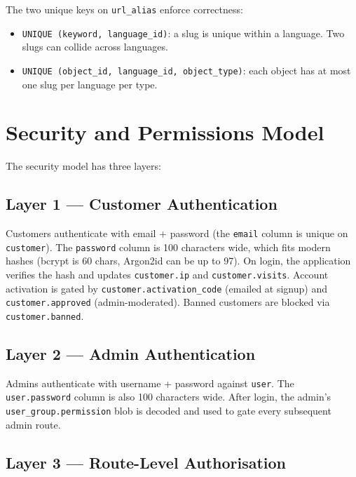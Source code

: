 \documentclass[11pt,a4paper]{article}
\begin{document}
The two unique keys on \texttt{url\_alias} enforce correctness:

\begin{itemize}[leftmargin=1.6em,itemsep=2pt]
  \item \texttt{UNIQUE (keyword, language\_id)}: a slug is unique
        within a language. Two slugs can collide across languages.
  \item \texttt{UNIQUE (object\_id, language\_id, object\_type)}:
        each object has at most one slug per language per type.
\end{itemize}

\section{Security and Permissions Model}\label{sec:security}

The security model has three layers:

\subsection{Layer 1 --- Customer Authentication}

Customers authenticate with email + password (the \texttt{email}
column is unique on \texttt{customer}). The \texttt{password}
column is 100 characters wide, which fits modern hashes
(bcrypt is 60 chars, Argon2id can be up to 97). On login, the
application verifies the hash and updates \texttt{customer.ip}
and \texttt{customer.visits}. Account activation is gated by
\texttt{customer.activation\_code} (emailed at signup) and
\texttt{customer.approved} (admin-moderated). Banned customers
are blocked via \texttt{customer.banned}.

\subsection{Layer 2 --- Admin Authentication}

Admins authenticate with username + password against
\texttt{user}. The \texttt{user.password} column is also 100
characters wide. After login, the admin's
\texttt{user\_group.permission} blob is decoded and used to
gate every subsequent admin route.

\subsection{Layer 3 --- Route-Level Authorisation}
\end{document}
